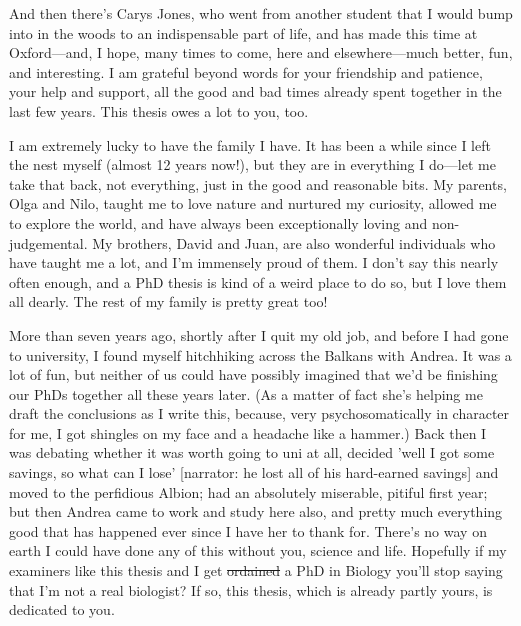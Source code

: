 And then there's Carys Jones, who went from another student that I would bump into in the woods to an indispensable part of life, and has made this time at Oxford---and, I hope, many times to come, here and elsewhere---much better, fun, and interesting. I am grateful beyond words for your friendship and patience, your help and support, all the good and bad times already spent together in the last few years. This thesis owes a lot to you, too.

I am extremely lucky to have the family I have. It has been a while since I left the nest myself (almost 12 years now!), but they are in everything I do---let me take that back, not everything, just in the good and reasonable bits. My parents, Olga and Nilo, taught me to love nature and nurtured my curiosity, allowed me to explore the world, and have always been exceptionally loving and non-judgemental. My brothers, David and Juan, are also wonderful individuals who have taught me a lot, and I'm immensely proud of them. I don't say this nearly often enough, and a PhD thesis is kind of a weird place to do so, but I love them all dearly. The rest of my family is pretty great too!

More than seven years ago, shortly after I quit my old job, and before I had gone to university, I found myself hitchhiking across the Balkans with Andrea. It was a lot of fun, but neither of us could have possibly imagined that we'd be finishing our PhDs together all these years later. (As a matter of fact she's helping me draft the conclusions as I write this, because, very psychosomatically in character for me, I got shingles on my face and a headache like a hammer.) Back then I was debating whether it was worth going to uni at all, decided 'well I got some savings, so what can I lose' [narrator: he lost all of his hard-earned savings] and moved to the perfidious Albion; had an absolutely miserable, pitiful first year; but then Andrea came to work and study here also, and pretty much everything good that has happened ever since I have her to thank for. There's no way on earth I could have done any of this without you, science and life. Hopefully if my examiners like this thesis and I get \sout{ordained} a PhD in Biology you'll stop saying that I'm not a real biologist? If so, this thesis, which is already partly yours, is dedicated to you.
